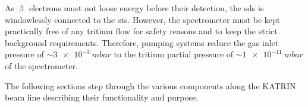 As $\upbeta$ electrons must not loose energy before their detection, the \gls{sds} is windowlessly connected to the \gls{sts}. However, the spectrometer must be kept practically free of any tritium flow for safety reasons and to keep the strict background requirements. Therefore, pumping systems reduce the gas inlet pressure of $\sim\SI{3e-3}{mbar}$ to the tritium partial pressure of $\sim\SI{1e-11}{mbar}$ of the spectrometer.

The following sections step through the various components along the KATRIN beam line describing their functionality and purpose.
